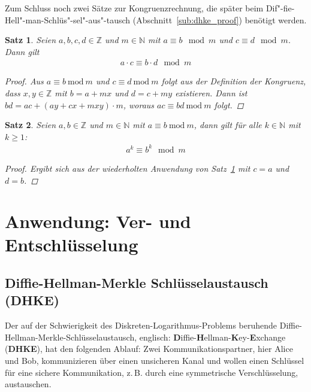\documentclass[
  a4paper,
  11pt,
]{scrartcl}
\theoremstyle{plain}
\newtheorem{satz}{Satz}
\theoremstyle{definition}
\theoremstyle{remark}
\newcommand{\N}{\mathbb{N}}
\newcommand{\Z}{\mathbb{Z}}
\newcommand{\Mod}[1]{\ \mathrm{mod}\ #1}
\begin{document}
Zum Schluss noch zwei Sätze zur Kongruenzrechnung, die später beim
Dif"-fie-Hell"-man-Schlüs"-sel"-aus"-tausch (Abschnitt~\ref{sub:dhke_proof})
benötigt werden.

\begin{satz}\label{satz:multiplikation_modulo}
  Seien $a,b,c,d \in \Z$ und $m \in \N$ mit $a \equiv b \mod m$ und $c \equiv d
  \mod m$. Dann gilt
  \begin{align*}
    a \cdot c \equiv b \cdot d \mod m
  \end{align*}
  \begin{proof}
    Aus $a \equiv b \Mod{m}$ und $c \equiv d \Mod{m}$ folgt aus der Definition
    der Kongruenz, dass $x, y \in \Z$ mit $b = a+mx$ und $d = c+my$ existieren.
    Dann ist $bd = ac + (ay + cx + mxy) \cdot m$, woraus $ac \equiv bd \Mod{m}$
    folgt.
  \end{proof}
\end{satz}

\begin{satz}\label{satz:potenzen_bei_kongruenzen}
  Seien $a, b \in \Z$ und $m \in \N$ mit $a \equiv b \Mod{m}$, dann gilt für
  alle $k \in \N$ mit $k \geq 1$:
  \begin{align*}
    a^k \equiv b^k \mod m
  \end{align*}
  \begin{proof}
    Ergibt sich aus der wiederholten Anwendung von
    Satz~\ref{satz:multiplikation_modulo} mit $c = a$ und $d = b$.
  \end{proof}
\end{satz}

\section{Anwendung: Ver- und Entschlüsselung}
\label{sec:anwendung_ver_und_entschlusselung}

\subsection{Diffie-Hellman-Merkle Schlüsselaustausch (DHKE)}
\label{sub:diffie_hellman_key_exchange}

Der auf der Schwierigkeit des Diskreten-Logarithmus-Problems beruhende 
Diffie-Hellman-Merkle-Schlüsselaustausch, englisch: 
\textbf{D}iffie-\textbf{H}ellman-\textbf{K}ey-\textbf{E}xchange (\textbf{DHKE}), 
hat den folgenden Ablauf: 
Zwei Kommunikationspartner, hier Alice und Bob, kommunizieren über einen 
unsicheren Kanal und wollen einen Schlüssel für eine sichere Kommunikation, 
z.\,B. durch eine symmetrische Verschlüsselung, austauschen. 
 
\end{document}
